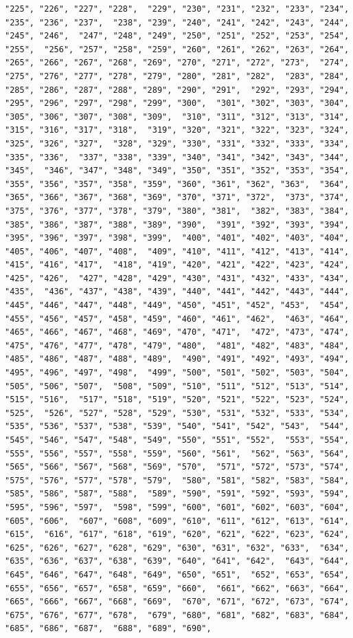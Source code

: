 \documentclass[
]{article}
\begin{document}
\begin{verbatim}
"225", "226", "227", "228",  "229", "230", "231", "232", "233", "234", "235", "236", "237",  "238", "239", "240", "241", "242", "243", "244", "245", "246",  "247", "248", "249", "250", "251", "252", "253", "254", "255",  "256", "257", "258", "259", "260", "261", "262", "263", "264",  "265", "266", "267", "268", "269", "270", "271", "272", "273",  "274", "275", "276", "277", "278", "279", "280", "281", "282",  "283", "284", "285", "286", "287", "288", "289", "290", "291",  "292", "293", "294", "295", "296", "297", "298", "299", "300",  "301", "302", "303", "304", "305", "306", "307", "308", "309",  "310", "311", "312", "313", "314", "315", "316", "317", "318",  "319", "320", "321", "322", "323", "324", "325", "326", "327",  "328", "329", "330", "331", "332", "333", "334", "335", "336",  "337", "338", "339", "340", "341", "342", "343", "344", "345",  "346", "347", "348", "349", "350", "351", "352", "353", "354",  "355", "356", "357", "358", "359", "360", "361", "362", "363",  "364", "365", "366", "367", "368", "369", "370", "371", "372",  "373", "374", "375", "376", "377", "378", "379", "380", "381",  "382", "383", "384", "385", "386", "387", "388", "389", "390",  "391", "392", "393", "394", "395", "396", "397", "398", "399",  "400", "401", "402", "403", "404", "405", "406", "407", "408",  "409", "410", "411", "412", "413", "414", "415", "416", "417",  "418", "419", "420", "421", "422", "423", "424", "425", "426",  "427", "428", "429", "430", "431", "432", "433", "434", "435",  "436", "437", "438", "439", "440", "441", "442", "443", "444",  "445", "446", "447", "448", "449", "450", "451", "452", "453",  "454", "455", "456", "457", "458", "459", "460", "461", "462",  "463", "464", "465", "466", "467", "468", "469", "470", "471",  "472", "473", "474", "475", "476", "477", "478", "479", "480",  "481", "482", "483", "484", "485", "486", "487", "488", "489",  "490", "491", "492", "493", "494", "495", "496", "497", "498",  "499", "500", "501", "502", "503", "504", "505", "506", "507",  "508", "509", "510", "511", "512", "513", "514", "515", "516",  "517", "518", "519", "520", "521", "522", "523", "524", "525",  "526", "527", "528", "529", "530", "531", "532", "533", "534",  "535", "536", "537", "538", "539", "540", "541", "542", "543",  "544", "545", "546", "547", "548", "549", "550", "551", "552",  "553", "554", "555", "556", "557", "558", "559", "560", "561",  "562", "563", "564", "565", "566", "567", "568", "569", "570",  "571", "572", "573", "574", "575", "576", "577", "578", "579",  "580", "581", "582", "583", "584", "585", "586", "587", "588",  "589", "590", "591", "592", "593", "594", "595", "596", "597",  "598", "599", "600", "601", "602", "603", "604", "605", "606",  "607", "608", "609", "610", "611", "612", "613", "614", "615",  "616", "617", "618", "619", "620", "621", "622", "623", "624",  "625", "626", "627", "628", "629", "630", "631", "632", "633",  "634", "635", "636", "637", "638", "639", "640", "641", "642",  "643", "644", "645", "646", "647", "648", "649", "650", "651",  "652", "653", "654", "655", "656", "657", "658", "659", "660",  "661", "662", "663", "664", "665", "666", "667", "668", "669",  "670", "671", "672", "673", "674", "675", "676", "677", "678",  "679", "680", "681", "682", "683", "684", "685", "686", "687",  "688", "689", "690", 
\end{verbatim}
\end{document}
